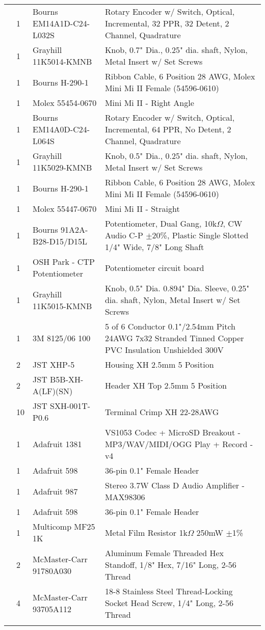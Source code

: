 \begin{longtabu}{X[3,c,m] X[1,c,m] X[3,c,m] X[5,l,m]}
   & 1 & Bourns EM14A1D-C24-L032S & Rotary Encoder w/ Switch, Optical, Incremental, 32 PPR, 32 Detent, 2 Channel, Quadrature \\
  & 1 & Grayhill 11K5014-KMNB & Knob, 0.7" Dia., 0.25" dia. shaft, Nylon, Metal Insert w/ Set Screws \\
  & 1 & Bourns H-290-1 & Ribbon Cable, 6 Position 28 AWG, Molex Mini Mi II Female (54596-0610) \\
  & 1 & Molex 55454-0670 & Mini Mi II - Right Angle \\ \mrule

   & 1 & Bourns EM14A0D-C24-L064S & Rotary Encoder w/ Switch, Optical, Incremental, 64 PPR, No Detent, 2 Channel, Quadrature \\
  & 1 & Grayhill 11K5029-KMNB & Knob, 0.5" Dia., 0.25" dia. shaft, Nylon, Metal Insert w/ Set Screws \\
  & 1 & Bourns H-290-1 & Ribbon Cable, 6 Position 28 AWG, Molex Mini Mi II Female (54596-0610) \\
  & 1 & Molex 55447-0670 & Mini Mi II - Straight \\ \mrule

   & 1 & Bourns 91A2A-B28-D15/D15L & Potentiometer, Dual Gang, 10k$\Omega$, CW Audio C-P $\pm$20\%, Plastic Single Slotted 1/4" Wide, 7/8" Long Shaft \\
  & 1 & OSH Park - CTP Potentiometer & Potentiometer circuit board \\
  & 1 & Grayhill 11K5015-KMNB & Knob, 0.5" Dia. 0.894" Dia. Sleeve, 0.25" dia. shaft, Nylon, Metal Insert w/ Set Screws \\
  & 1 & 3M 8125/06 100 & 5 of 6 Conductor 0.1"/2.54mm Pitch 24AWG 7x32 Stranded Tinned Copper PVC Insulation Unshielded 300V \\
  & 2 & JST XHP-5 & Housing XH 2.5mm 5 Position \\
  & 2 & JST B5B-XH-A(LF)(SN) & Header XH Top 2.5mm 5 Position \\
  & 10 & JST SXH-001T-P0.6 & Terminal Crimp XH 22-28AWG \\ \mrule

   & 1 & Adafruit 1381 & VS1053 Codec + MicroSD Breakout - MP3/WAV/MIDI/OGG Play + Record - v4 \\
  & 1 & Adafruit 598 & 36-pin 0.1" Female Header \\ \mrule

   & 1 & Adafruit 987 & Stereo 3.7W Class D Audio Amplifier - MAX98306 \\
  & 1 & Adafruit 598 & 36-pin 0.1" Female Header \\
  & 1 & Multicomp MF25 1K & Metal Film Resistor 1k$\Omega$ 250mW $\pm$1\% \\
  & 2 & McMaster-Carr 91780A030 & Aluminum Female Threaded Hex Standoff, 1/8" Hex, 7/16" Long, 2-56 Thread \\
  & 4 & McMaster-Carr 93705A112 & 18-8 Stainless Steel Thread-Locking Socket Head Screw, 1/4" Long, 2-56 Thread \\ \mrule


\end{longtabu}
